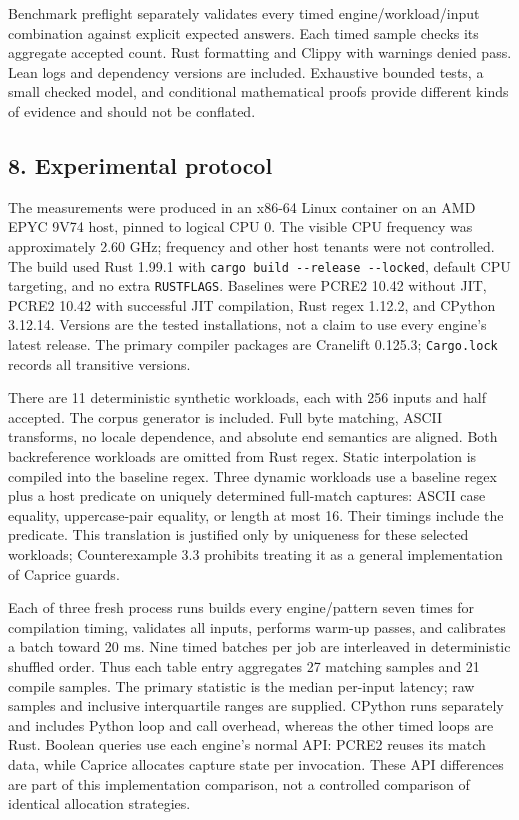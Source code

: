 \documentclass[
  11pt,
]{article}
\begin{document}
Benchmark preflight separately validates every timed
engine/workload/input combination against explicit expected answers.
Each timed sample checks its aggregate accepted count. Rust formatting
and Clippy with warnings denied pass. Lean logs and dependency versions
are included. Exhaustive bounded tests, a small checked model, and
conditional mathematical proofs provide different kinds of evidence and
should not be conflated.

\hypertarget{experimental-protocol}{%
\subsection{8. Experimental protocol}\label{experimental-protocol}}

The measurements were produced in an x86-64 Linux container on an AMD
EPYC 9V74 host, pinned to logical CPU 0. The visible CPU frequency was
approximately 2.60 GHz; frequency and other host tenants were not
controlled. The build used Rust 1.99.1 with
\texttt{cargo\ build\ -\/-release\ -\/-locked}, default CPU targeting,
and no extra \texttt{RUSTFLAGS}. Baselines were PCRE2 10.42 without JIT,
PCRE2 10.42 with successful JIT compilation, Rust regex 1.12.2, and
CPython 3.12.14. Versions are the tested installations, not a claim to
use every engine's latest release. The primary compiler packages are
Cranelift 0.125.3; \texttt{Cargo.lock} records all transitive versions.

There are 11 deterministic synthetic workloads, each with 256 inputs and
half accepted. The corpus generator is included. Full byte matching,
ASCII transforms, no locale dependence, and absolute end semantics are
aligned. Both backreference workloads are omitted from Rust regex.
Static interpolation is compiled into the baseline regex. Three dynamic
workloads use a baseline regex plus a host predicate on uniquely
determined full-match captures: ASCII case equality, uppercase-pair
equality, or length at most 16. Their timings include the predicate.
This translation is justified only by uniqueness for these selected
workloads; Counterexample 3.3 prohibits treating it as a general
implementation of Caprice guards.

Each of three fresh process runs builds every engine/pattern seven times
for compilation timing, validates all inputs, performs warm-up passes,
and calibrates a batch toward 20 ms. Nine timed batches per job are
interleaved in deterministic shuffled order. Thus each table entry
aggregates 27 matching samples and 21 compile samples. The primary
statistic is the median per-input latency; raw samples and inclusive
interquartile ranges are supplied. CPython runs separately and includes
Python loop and call overhead, whereas the other timed loops are Rust.
Boolean queries use each engine's normal API: PCRE2 reuses its match
data, while Caprice allocates capture state per invocation. These API
differences are part of this implementation comparison, not a controlled
comparison of identical allocation strategies.
\end{document}
